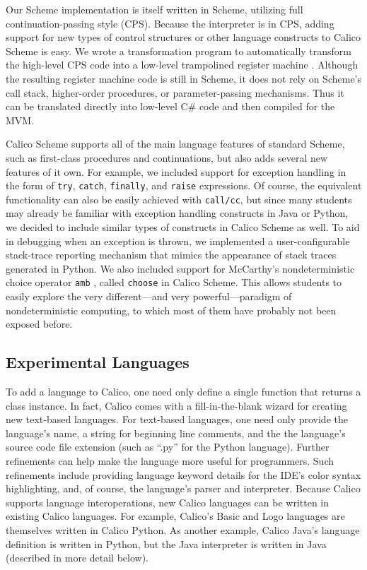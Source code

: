 \documentclass[preprint]{sigplanconf}
\begin{document}
Our Scheme implementation is itself written in Scheme, utilizing full
continuation-passing style (CPS).  Because the interpreter is in CPS, adding
support for new types of control structures or other language constructs to
Calico Scheme is easy.  We wrote a transformation program to automatically
transform the high-level CPS code into a low-level trampolined register machine
\cite{EOPL3}.  Although the resulting register machine code is still in Scheme,
it does not rely on Scheme's call stack, higher-order procedures, or
parameter-passing mechanisms.  Thus it can be translated directly into
low-level C\# code and then compiled for the MVM.
 
Calico Scheme supports all of the main language features of standard Scheme,
such as first-class procedures and continuations, but also adds several new
features of it own.  For example, we included support for exception handling in
the form of \texttt{try}, \texttt{catch}, \texttt{finally}, and \texttt{raise}
expressions.  Of course, the equivalent functionality can also be easily
achieved with \texttt{call/cc}, but since many students may already be familiar
with exception handling constructs in Java or Python, we decided to include
similar types of constructs in Calico Scheme as well.  To aid in debugging when
an exception is thrown, we implemented a user-configurable stack-trace
reporting mechanism that mimics the appearance of stack traces generated in
Python.  We also included support for McCarthy's nondeterministic choice
operator \texttt{amb} \cite{AMB}, called \texttt{choose} in Calico Scheme.
This allows students to easily explore the very different---and very
powerful---paradigm of nondeterministic computing, to which most of them have
probably not been exposed before.


\subsection{Experimental Languages}

To add a language to Calico, one need only define a single function
that returns a class instance. In fact, Calico comes with a
fill-in-the-blank wizard for creating new text-based languages. For
text-based languages, one need only provide the language's name, a
string for beginning line comments, and the the language's source code
file extension (such as ``.py'' for the Python language). Further
refinements can help make the language more useful for
programmers. Such refinements include providing language keyword
details for the IDE's color syntax highlighting, and, of course, the
language's parser and interpreter. Because Calico supports language
interoperations, new Calico languages can be written in existing
Calico languages. For example, Calico's Basic and Logo languages are
themselves written in Calico Python. As another example, Calico Java's
language definition is written in Python, but the Java interpreter is
written in Java (described in more detail below).
\end{document}
